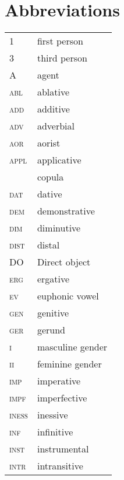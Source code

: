 \documentclass[output=paper,colorlinks,citecolor=brown,draftmode]{langscibook}
\begin{document}
\section*{Abbreviations}
\begin{tabularx}{.45\textwidth}{@{}lQ@{}}
1 & first person \\
3 & third person \\
A & agent \\
\textsc{abl} & {ablative} \\
\textsc{add} & additive \\
\textsc{adv} & adverbial \\
\textsc{aor} & aorist \\
\textsc{appl} & applicative \\
 & {copula} \\
\textsc{dat} & {dative} \\
\textsc{dem} & demonstrative \\
\textsc{dim} & diminutive \\
\textsc{dist} & distal \\
DO & Direct {object} \\
\textsc{erg} & {ergative} \\
\textsc{ev} & euphonic vowel \\
\textsc{gen} & genitive \\
\textsc{ger} & gerund \\
\textsc{i} & masculine gender \\
\textsc{ii} & feminine gender \\
\textsc{imp} & imperative \\
\textsc{impf} & imperfective \\
\textsc{iness} & inessive \\
\textsc{inf} & infinitive \\
\textsc{inst} & instrumental \\
\textsc{intr} & intransitive \\
\end{tabularx}%
\end{document}
